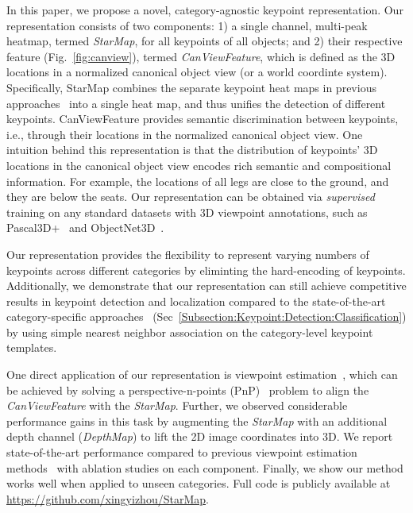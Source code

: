 \documentclass[runningheads]{llncs}
\begin{document}
In this paper, we propose a novel, category-agnostic keypoint representation.
Our representation consists of two components: 1) a single channel, multi-peak heatmap, termed \emph{StarMap}, for all keypoints of all objects; 
and 2) their respective feature (Fig.~\ref{fig:canview}), termed \emph{CanViewFeature}, which is defined as the 3D locations in a normalized canonical object view (or a world coordinte system). 
Specifically, StarMap combines the separate keypoint heat maps in previous approaches~\cite{tulsiani2015viewpoints,pavlakos20176} into a single heat map, and thus unifies the detection of different keypoints. 
CanViewFeature provides semantic discrimination between keypoints, i.e., through their locations in the normalized canonical object view.
One intuition behind this representation is that the distribution of keypoints' 3D locations in the canonical object view encodes rich semantic and compositional information. For example, the locations of all legs are close to the ground, and they are below the seats.
Our representation can be obtained via \emph{supervised} training on any standard datasets with 3D viewpoint annotations, such as Pascal3D+~\cite{xiang2014beyond} and ObjectNet3D~\cite{xiang2016objectnet3d}.

Our representation provides the flexibility to represent varying numbers of keypoints across different categories by eliminting the hard-encoding of keypoints. Additionally, we demonstrate that our representation can still achieve competitive results in keypoint detection and localization compared to the state-of-the-art category-specific approaches~\cite{long2014convnets,tulsiani2015viewpoints} (Sec~\ref{Subsection:Keypoint:Detection:Classification}) by using simple nearest neighbor association on the category-level keypoint templates.


One direct application of our representation is viewpoint estimation~\cite{tulsiani2015viewpoints,su2015render,mousavian20173d}, which can be achieved by solving a perspective-n-points (PnP)~\cite{lepetit2009epnp} problem to align the \emph{CanViewFeature} with the \emph{StarMap}. 
Further, we observed considerable performance gains in this task by augmenting the \emph{StarMap} with an additional depth channel (\emph{DepthMap}) to lift the 2D image coordinates into 3D. 
We report state-of-the-art performance compared to previous viewpoint estimation methods~\cite{su2015render,pavlakos20176,mousavian20173d,tulsiani2015viewpoints} with ablation studies on each component.
Finally, we show our method works well when applied to unseen categories. 
Full code is publicly available at 
\url{https://github.com/xingyizhou/StarMap}. 
\end{document}
